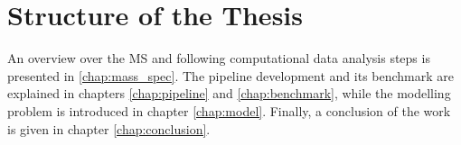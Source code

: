 \section{Structure of the Thesis}

An overview over the \ac{MS} and following computational data analysis steps is presented in \ref{chap:mass_spec}. The pipeline development and its benchmark are explained in chapters \ref{chap:pipeline} and \ref{chap:benchmark}, while the modelling problem is introduced in chapter \ref{chap:model}. Finally, a conclusion of the work is given in chapter \ref{chap:conclusion}.